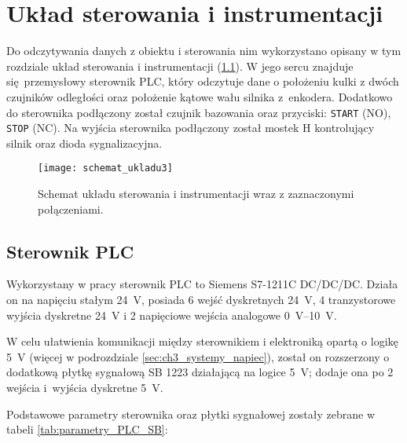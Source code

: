 \chapter{Układ sterowania i instrumentacji}
\label{cha:ch3_uklad_ster_i_instrumentacji}

Do odczytywania danych z obiektu i sterowania nim wykorzystano opisany w tym rozdziale układ sterowania i instrumentacji (\cref{fig:schemat_ukl_sterowania_instrumentacji}). W jego sercu znajduje się przemysłowy sterownik PLC, który odczytuje dane o położeniu kulki z dwóch czujników odległości oraz położenie kątowe wału silnika z~enkodera. Dodatkowo do sterownika podłączony został czujnik bazowania oraz przyciski: \texttt{START} (NO), \texttt{STOP} (NC). Na wyjścia sterownika podłączony został mostek H kontrolujący silnik oraz dioda sygnalizacyjna.


\begin{figure}[H]
    \centering
    \texttt{[image: schemat\_ukladu3]}
    \caption{Schemat układu sterowania i instrumentacji wraz z zaznaczonymi połączeniami.}
    \label{fig:schemat_ukl_sterowania_instrumentacji}
\end{figure}

\section{Sterownik PLC}
\label{sec:ch3_PLC}

Wykorzystany w pracy sterownik PLC to Siemens S7-1211C DC/DC/DC. Działa on na napięciu stałym \SI{24}{V}, posiada 6 wejść dyskretnych \SI{24}{V}, 4 tranzystorowe wyjścia dyskretne \SI{24}{V} i 2 napięciowe wejścia analogowe \SIrange[range-units=single]{0}{10}{V}.

W celu ułatwienia komunikacji między sterownikiem i elektroniką opartą o logikę \SI{5}{V} (więcej w podrozdziale \ref{sec:ch3_systemy_napiec}), został on rozszerzony o dodatkową płytkę sygnałową SB 1223 działającą na logice \SI{5}{V}; dodaje ona po 2 wejścia i~wyjścia dyskretne \SI{5}{V}.

Podstawowe parametry sterownika oraz płytki sygnałowej zostały zebrane w tabeli \ref{tab:parametry_PLC_SB}:

